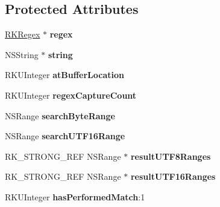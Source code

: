 \subsection*{Protected Attributes}
\begin{DoxyCompactItemize}
\item 
\hypertarget{interface_r_k_enumerator_a0332230c5efcec00b481ba3a4c698962}{\hyperlink{interface_r_k_regex}{R\-K\-Regex} $\ast$ {\bfseries regex}}\label{interface_r_k_enumerator_a0332230c5efcec00b481ba3a4c698962}

\item 
\hypertarget{interface_r_k_enumerator_a02cc03bccf9bf32ce91677032a1bc364}{N\-S\-String $\ast$ {\bfseries string}}\label{interface_r_k_enumerator_a02cc03bccf9bf32ce91677032a1bc364}

\item 
\hypertarget{interface_r_k_enumerator_aee680d24622d627fee40ff7a67d4933a}{R\-K\-U\-Integer {\bfseries at\-Buffer\-Location}}\label{interface_r_k_enumerator_aee680d24622d627fee40ff7a67d4933a}

\item 
\hypertarget{interface_r_k_enumerator_a07ede92e2a0d5717b917f4ac23739418}{R\-K\-U\-Integer {\bfseries regex\-Capture\-Count}}\label{interface_r_k_enumerator_a07ede92e2a0d5717b917f4ac23739418}

\item 
\hypertarget{interface_r_k_enumerator_afd419d9a74cdd9aadb6f835dc9104a45}{N\-S\-Range {\bfseries search\-Byte\-Range}}\label{interface_r_k_enumerator_afd419d9a74cdd9aadb6f835dc9104a45}

\item 
\hypertarget{interface_r_k_enumerator_a72243e26252a6a5c6aee95715be79167}{N\-S\-Range {\bfseries search\-U\-T\-F16\-Range}}\label{interface_r_k_enumerator_a72243e26252a6a5c6aee95715be79167}

\item 
\hypertarget{interface_r_k_enumerator_a6877d05a7d43c4f27c45f0f6870592ab}{R\-K\-\_\-\-S\-T\-R\-O\-N\-G\-\_\-\-R\-E\-F N\-S\-Range $\ast$ {\bfseries result\-U\-T\-F8\-Ranges}}\label{interface_r_k_enumerator_a6877d05a7d43c4f27c45f0f6870592ab}

\item 
\hypertarget{interface_r_k_enumerator_ad0520356509cf2b3e500b7a1277a56ea}{R\-K\-\_\-\-S\-T\-R\-O\-N\-G\-\_\-\-R\-E\-F N\-S\-Range $\ast$ {\bfseries result\-U\-T\-F16\-Ranges}}\label{interface_r_k_enumerator_ad0520356509cf2b3e500b7a1277a56ea}

\item 
\hypertarget{interface_r_k_enumerator_a77c40111f73bb1c3c2ffca44e7d68b41}{R\-K\-U\-Integer {\bfseries has\-Performed\-Match}\-:1}\label{interface_r_k_enumerator_a77c40111f73bb1c3c2ffca44e7d68b41}

\end{DoxyCompactItemize}


